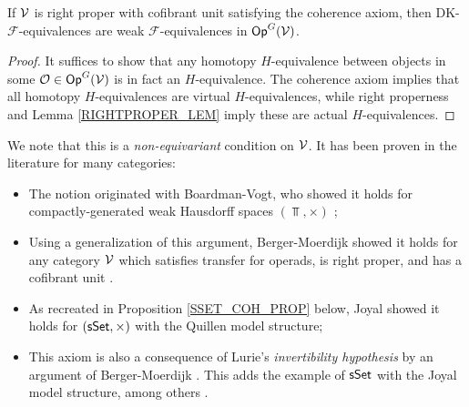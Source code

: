 \documentclass[a4paper,10pt
,draft
]{article}%
\renewcommand{\F}{\mathcal F}
\renewcommand{\1}{\eta}%
\begin{document}
\begin{proposition}[{cf. \cite[Prop. 2.20]{BM13}}]
      \label{COH_DK_ARE_WE_PROP}
      If $\mathcal V$ is right proper with cofibrant unit satisfying the coherence axiom, then
      DK-$\F$-equivalences are weak $\F$-equivalences in $\mathsf{Op}^G(\mathcal V)$.
\end{proposition}
\begin{proof}
      It suffices to show that any homotopy $H$-equivalence between objects in some $\mathcal{O} \in \mathsf{Op}^G(\mathcal V)$
      is in fact an $H$-equivalence.
      The coherence axiom implies that all homotopy $H$-equivalences are virtual $H$-equivalences,
      while right properness and Lemma \ref{RIGHTPROPER_LEM} imply these are actual $H$-equivalences.
\end{proof}

We note that this is a \textit{non-equivariant} condition on $\mathcal V$.
It has been proven in the literature for many categories:
\begin{itemize}      
\item The notion originated with Boardman-Vogt, who showed it holds for compactly-generated weak Hausdorff spaces $(\Top, \times)$ \cite[Lem. 4.16]{BV73};
\item Using a generalization of this argument, Berger-Moerdijk showed it holds for any category $\mathcal V$ which satisfies transfer for operads, is right proper, and has a cofibrant unit \cite[Prop. 2.24]{BM13}.
\item As recreated in Proposition \ref{SSET_COH_PROP} below, Joyal showed it holds for $(\mathsf{sSet}, \times)$ with the Quillen model structure;
\item This axiom is also a consequence of Lurie's \textit{invertibility hypothesis} \cite[A.3.2.12]{Lur09} by an argument of Berger-Moerdijk \cite[Rem. 2.19]{BM13}.
      This adds the example of $\mathsf{sSet}$ with the Joyal model structure, among others \cite[A.3.2.23]{Lur09}.
\end{itemize}
\end{document}
